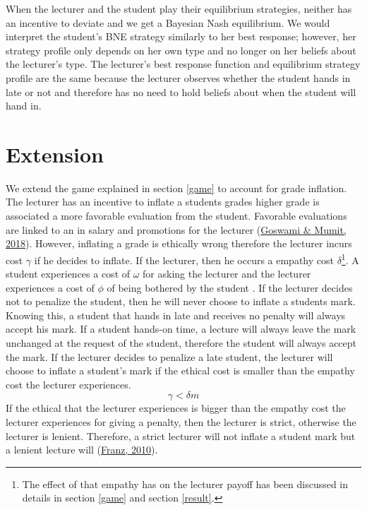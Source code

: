 \documentclass[11pt,preprint, authoryear]{elsarticle}
\numberwithin{equation}{section}
\numberwithin{figure}{section}
\numberwithin{table}{section}
\let\rmarkdownfootnote\footnote%
\def\footnote{\protect\rmarkdownfootnote}
\begin{document}
When the lecturer and the student play their equilibrium strategies,
neither has an incentive to deviate and we get a Bayesian Nash
equilibrium. We would interpret the student's BNE strategy similarly to
her best response; however, her strategy profile only depends on her own
type and no longer on her beliefs about the lecturer's type. The
lecturer's best response function and equilibrium strategy profile are
the same because the lecturer observes whether the student hands in late
or not and therefore has no need to hold beliefs about when the student
will hand in.

\hypertarget{extension}{%
\section{\texorpdfstring{Extension
\label{extension}}{Extension }}\label{extension}}

We extend the game explained in section \ref{game} to account for grade
inflation. The lecturer has an incentive to inflate a students grades
higher grade is associated a more favorable evaluation from the student.
Favorable evaluations are linked to an in salary and promotions for the
lecturer (\protect\hyperlink{ref-2018grades}{Goswami \& Mumit, 2018}).
However, inflating a grade is ethically wrong therefore the lecturer
incurs cost \(\gamma\) if he decides to inflate. If the lecturer, then
he occurs a empathy cost
\(\delta\)\footnote{The effect of that empathy has on the lecturer payoff has been discussed in details in section \ref{game} and section \ref{result}.}.
A student experiences a cost of \(\omega\) for asking the lecturer and
the lecturer experiences a cost of \(\phi\) of being bothered by the
student . If the lecturer decides not to penalize the student, then he
will never choose to inflate a students mark. Knowing this, a student
that hands in late and receives no penalty will always accept his mark.
If a student hands-on time, a lecture will always leave the mark
unchanged at the request of the student, therefore the student will
always accept the mark. If the lecturer decides to penalize a late
student, the lecturer will choose to inflate a student's mark if the
ethical cost is smaller than the empathy cost the lecturer experiences.
\[\gamma < \delta m \] If the ethical that the lecturer experiences is
bigger than the empathy cost the lecturer experiences for giving a
penalty, then the lecturer is strict, otherwise the lecturer is lenient.
Therefore, a strict lecturer will not inflate a student mark but a
lenient lecture will (\protect\hyperlink{ref-2010grade}{Franz, 2010}).
\end{document}
